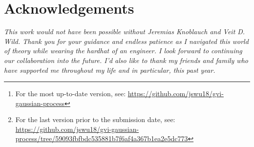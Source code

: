 \documentclass{article}
\numberwithin{equation}{section}
\begin{document}

\begin{abstract}
Proposed by \cite{knoblauch2022optimization}, generalised variational inference (GVI) is a learning framework motivated by an optimisation-centric interpretation of Bayesian inference. 
Extending GVI to infinite dimensions, \cite{wild2022generalized} introduces Gaussian Wasserstein inference (GWI) in function spaces. 
GWI demonstrates a new inference approach for variational Gaussian Processes (GPs), circumventing many limitations of previous approaches.
Our work introduces various improvements to GWI for GPs, including new kernel parameterisations such as the NNGP kernels from \cite{novak2019neural}. We also introduce a new learning framework that we call projected GVI (pGVI) for GPs. 
pGVI weakens the GVI assumption of a definite regulariser.
Instead, we propose regularising between scalar projections of the stochastic processes, an approach we call projected regularisation.
We demonstrate that pGVI is a highly flexible and well-performing variational inference framework with significantly cheaper linearly time computational costs compared to the cubic costs of existing approaches.
We also present our learning frameworks through a comprehensive software implementation available on 
\href{https://github.com/jswu18/gvi-gaussian-process}{GitHub}\footnote{For the most up-to-date version, see: \href{https://github.com/jswu18/gvi-gaussian-process}{https://github.com/jswu18/gvi-gaussian-process}}$^{,}$\footnote{
For the last version prior to the submission date, see: \\\href{https://github.com/jswu18/gvi-gaussian-process/tree/59093fbfbdc535881b7f6af4a367b1ea2e5dc773}{https://github.com/jswu18/gvi-gaussian-process/tree/59093fbfbdc535881b7f6af4a367b1ea2e5dc773}}.
\end{abstract}

\newpage
\section*{Acknowledgements}
\textit{This work would not have been possible without Jeremias Knoblauch and Veit D. Wild. 
Thank you for your guidance and endless patience as I navigated this world of theory while wearing the hardhat of an engineer. 
I look forward to continuing our collaboration into the future.
I’d also like to thank my friends and family who have supported me throughout my life and in particular, this past year. 
}
\end{document}
